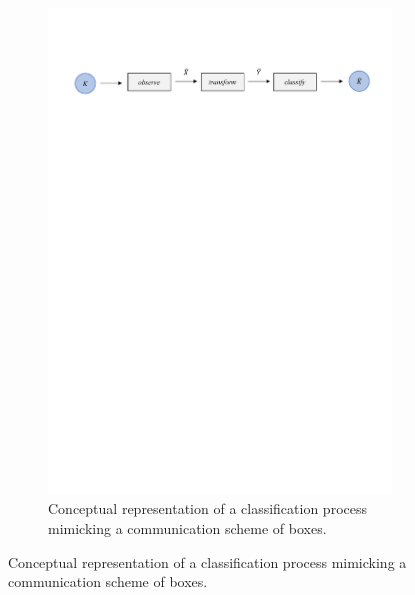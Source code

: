 \documentclass[12pt]{report}
\begin{document}
\begin{figure}[h]
\begin{subfigure}{1\textwidth}  
 \centering
  \includegraphics[width=16cm]{Figuras_tfg/Figura1_tfg}
  \caption{Conceptual representation of a classification process mimicking a communication scheme of boxes.}
 \label{fig:fig1a} 
\end{subfigure}%


\end{figure}
\end{document}
